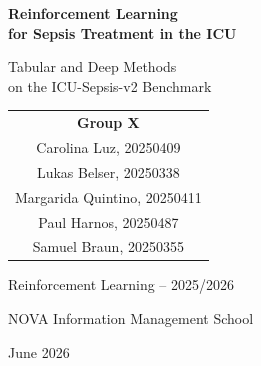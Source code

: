 \documentclass[11pt,a4paper]{article}
\begin{document}
\begin{titlepage}
    \centering
    \vspace*{2.5cm}

    {\Huge\bfseries Reinforcement Learning\\[8pt] for Sepsis Treatment in the ICU\par}

    \vspace{1.2cm}

    {\Large Tabular and Deep Methods\\[4pt] on the ICU-Sepsis-v2 Benchmark\par}

    \vspace{2.8cm}

    {\large
    \begin{tabular}{c}
        \textbf{Group X}\\[12pt]
        Carolina Luz, 20250409\\
        Lukas Belser, 20250338\\
        Margarida Quintino, 20250411\\
        Paul Harnos, 20250487\\
        Samuel Braun, 20250355\\
    \end{tabular}
    \par}

    \vspace{2cm}

    {\large Reinforcement Learning -- 2025/2026\par}

    \vfill

    {\large NOVA Information Management School\par}
    {\small June 2026\par}
\end{titlepage}

\tableofcontents
\clearpage
{}
\setcounter{page}{1}
\end{document}
